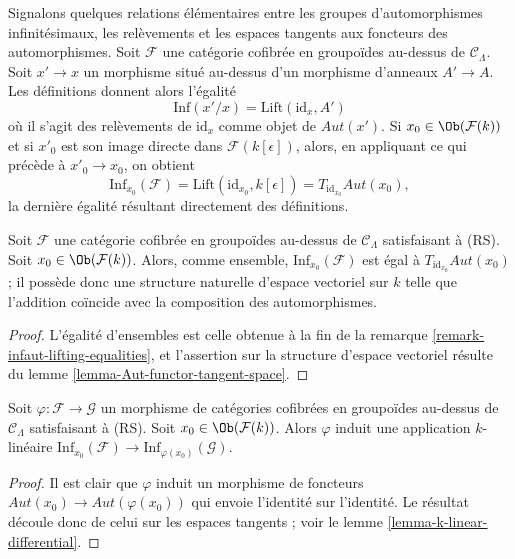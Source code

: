 \begin{remark}
\label{remark-infaut-lifting-equalities}
Signalons quelques relations élémentaires entre les groupes d'automorphismes
infinitésimaux, les relèvements et les espaces tangents aux foncteurs des
automorphismes. Soit $\mathcal{F}$ une catégorie cofibrée en groupoïdes
au-dessus de $\mathcal{C}_\Lambda$. Soit $x' \to x$ un morphisme situé au-dessus
d'un morphisme d'anneaux $A' \to A$. Les définitions donnent alors l'égalité
$$
\text{Inf}(x'/x) = \text{Lift}(\text{id}_x, A')
$$
où il s'agit des relèvements de $\text{id}_x$ comme objet de
$\mathit{Aut}(x')$. Si $x_0 \in \Ob(\mathcal{F}(k))$ et si $x'_0$ est son
image directe dans $\mathcal{F}(k[\epsilon])$, alors, en appliquant ce qui précède
à $x'_0 \to x_0$, on obtient
$$
\text{Inf}_{x_0}(\mathcal{F}) =
\text{Lift}(\text{id}_{x_0}, k[\epsilon]) =
T_{\text{id}_{x_0}} \mathit{Aut}(x_0),
$$
la dernière égalité résultant directement des définitions.
\end{remark}

\begin{lemma}
\label{lemma-infaut-vector-space}
Soit $\mathcal{F}$ une catégorie cofibrée en groupoïdes au-dessus de
$\mathcal{C}_\Lambda$ satisfaisant à (RS). Soit
$x_0 \in \Ob(\mathcal{F}(k))$. Alors, comme ensemble,
$\text{Inf}_{x_0}(\mathcal{F})$ est égal à
$T_{\text{id}_{x_0}} \mathit{Aut}(x_0)$ ; il possède donc une structure
naturelle d'espace vectoriel sur $k$ telle que l'addition coïncide avec la
composition des automorphismes.
\end{lemma}

\begin{proof}
L'égalité d'ensembles est celle obtenue à la fin de la remarque
\ref{remark-infaut-lifting-equalities}, et l'assertion sur la structure
d'espace vectoriel résulte du lemme \ref{lemma-Aut-functor-tangent-space}.
\end{proof}

\begin{lemma}
\label{lemma-k-linear-infaut}
Soit $\varphi : \mathcal{F} \to \mathcal{G}$ un morphisme de catégories
cofibrées en groupoïdes au-dessus de $\mathcal{C}_\Lambda$ satisfaisant à
(RS). Soit $x_0 \in \Ob(\mathcal{F}(k))$. Alors $\varphi$ induit une
application $k$-linéaire
$\text{Inf}_{x_0}(\mathcal{F}) \to \text{Inf}_{\varphi(x_0)}(\mathcal{G})$.
\end{lemma}

\begin{proof}
Il est clair que $\varphi$ induit un morphisme de foncteurs
$\mathit{Aut}(x_0) \to \mathit{Aut}(\varphi(x_0))$
qui envoie l'identité sur l'identité. Le résultat découle donc de celui sur les
espaces tangents ; voir le lemme \ref{lemma-k-linear-differential}.
\end{proof}

